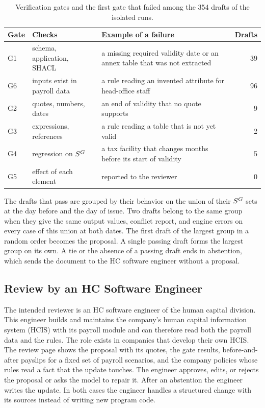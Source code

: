 \begin{table}[!t]
\caption{Verification gates and the first gate that failed among the 354 drafts of the isolated runs.}
\label{tab:gates}
\centering\footnotesize
\setlength{\tabcolsep}{3pt}
\begin{tabularx}{\columnwidth}{@{}lLLr@{}}
\toprule
Gate & Checks & Example of a failure & Drafts \\
\midrule
G1 & schema, application, SHACL & a missing required validity date or an annex table that was not extracted & 39 \\
G6 & inputs exist in payroll data & a rule reading an invented attribute for head-office staff & 96 \\
G2 & quotes, numbers, dates & an end of validity that no quote supports & 9 \\
G3 & expressions, references & a rule reading a table that is not yet valid & 2 \\
G4 & regression on $S^{G}$ & a tax facility that changes months before its start of validity & 5 \\
G5 & effect of each element & reported to the reviewer & 0 \\
\bottomrule
\end{tabularx}
\end{table}

The drafts that pass are grouped by their behavior on the union of their $S^{G}$ sets at the day before and the day of issue. Two drafts belong to the same group when they give the same output values, conflict report, and engine errors on every case of this union at both dates. The first draft of the largest group in a random order becomes the proposal. A single passing draft forms the largest group on its own. A tie or the absence of a passing draft ends in abstention, which sends the document to the HC software engineer without a proposal.

\subsection{Review by an HC Software Engineer}
\label{sec:review}
The intended reviewer is an HC software engineer of the human capital division. This engineer builds and maintains the company's human capital information system (HCIS) with its payroll module and can therefore read both the payroll data and the rules. The role exists in companies that develop their own HCIS. The review page shows the proposal with its quotes, the gate results, before-and-after payslips for a fixed set of payroll scenarios, and the company policies whose rules read a fact that the update touches. The engineer approves, edits, or rejects the proposal or asks the model to repair it. After an abstention the engineer writes the update. In both cases the engineer handles a structured change with its sources instead of writing new program code.

